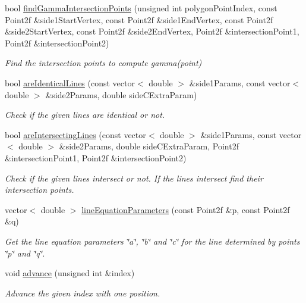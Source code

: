 \begin{DoxyCompactItemize}
bool \hyperlink{classmultiscale_1_1MinEnclosingTriangleFinder_a9eedc43ea3190d8ee6343879dc100edb}{find\-Gamma\-Intersection\-Points} (unsigned int polygon\-Point\-Index, const Point2f \&side1\-Start\-Vertex, const Point2f \&side1\-End\-Vertex, const Point2f \&side2\-Start\-Vertex, const Point2f \&side2\-End\-Vertex, Point2f \&intersection\-Point1, Point2f \&intersection\-Point2)
\begin{DoxyCompactList}\small\item\em Find the intersection points to compute gamma(point) \end{DoxyCompactList}\item 
bool \hyperlink{classmultiscale_1_1MinEnclosingTriangleFinder_a65a15d407aeab7f9b81fe527c9a53e81}{are\-Identical\-Lines} (const vector$<$ double $>$ \&side1\-Params, const vector$<$ double $>$ \&side2\-Params, double side\-C\-Extra\-Param)
\begin{DoxyCompactList}\small\item\em Check if the given lines are identical or not. \end{DoxyCompactList}\item 
bool \hyperlink{classmultiscale_1_1MinEnclosingTriangleFinder_a890d17359c3cdf30b6c20b08cd12b6c9}{are\-Intersecting\-Lines} (const vector$<$ double $>$ \&side1\-Params, const vector$<$ double $>$ \&side2\-Params, double side\-C\-Extra\-Param, Point2f \&intersection\-Point1, Point2f \&intersection\-Point2)
\begin{DoxyCompactList}\small\item\em Check if the given lines intersect or not. If the lines intersect find their intersection points. \end{DoxyCompactList}\item 
vector$<$ double $>$ \hyperlink{classmultiscale_1_1MinEnclosingTriangleFinder_ab2aa08fbf3d17d25f55eb21cd2524975}{line\-Equation\-Parameters} (const Point2f \&p, const Point2f \&q)
\begin{DoxyCompactList}\small\item\em Get the line equation parameters \char`\"{}a\char`\"{}, \char`\"{}b\char`\"{} and \char`\"{}c\char`\"{} for the line determined by points \char`\"{}p\char`\"{} and \char`\"{}q\char`\"{}. \end{DoxyCompactList}\item 
void \hyperlink{classmultiscale_1_1MinEnclosingTriangleFinder_af52c24da93e4660f043dbb0f92594a19}{advance} (unsigned int \&index)
\begin{DoxyCompactList}\small\item\em Advance the given index with one position. \end{DoxyCompactList}\item 

\end{DoxyCompactItemize}
